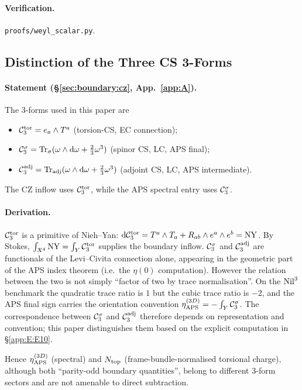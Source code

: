 \paragraph{Verification.}
\texttt{proofs/weyl\_scalar.py}.

\subsection{Distinction of the Three CS 3-Forms}
\label{app:E:E8}

\paragraph{Statement (\S\ref{sec:boundary:cz}, App.~\ref{app:A}).}
The 3-forms used in this paper are
\begin{itemize}
  \item $\mathcal{C}_3^{\mathrm{tor}} = e_a\wedge T^a$ (torsion-CS, EC connection);
  \item $\mathcal{C}_3^{\sigma} = \mathrm{Tr}_\sigma(\omega\wedge \mathrm{d}\omega + \tfrac{2}{3}\omega^3)$
        (spinor CS, LC, APS final);
  \item $\mathcal{C}_3^{\mathrm{adj}} = \mathrm{Tr}_{\mathrm{adj}}(\omega\wedge \mathrm{d}\omega + \tfrac{2}{3}\omega^3)$
        (adjoint CS, LC, APS intermediate).
\end{itemize}
The CZ inflow uses $\mathcal{C}_3^{\mathrm{tor}}$, while the APS spectral entry uses $\mathcal{C}_3^{\sigma}$.

\paragraph{Derivation.}
$\mathcal{C}_3^{\mathrm{tor}}$ is a primitive of Nieh--Yan:
$\mathrm{d}\mathcal{C}_3^{\mathrm{tor}} = T^a\wedge T_a + R_{ab}\wedge e^a\wedge e^b = \mathrm{NY}$.  By
Stokes, $\int_{X^4}\mathrm{NY} = \int_Y\mathcal{C}_3^{\mathrm{tor}}$ supplies the boundary inflow.
$\mathcal{C}_3^{\sigma}$ and $\mathcal{C}_3^{\mathrm{adj}}$ are functionals of the Levi--Civita connection alone,
appearing in the geometric part of the APS index theorem (i.e.\ the
$\eta(0)$ computation).  However the relation between the two is not
simply ``factor of two by trace normalisation''.  On the $\mathrm{Nil}^3$
benchmark the quadratic trace ratio is $1$ but the cubic trace ratio is
$-2$, and the APS final sign carries the orientation convention
$\eta_{\mathrm{APS}}^{(3D)} = -\int_Y \mathcal{C}_3^{\sigma}$.  The correspondence between $\mathcal{C}_3^{\sigma}$ and $\mathcal{C}_3^{\mathrm{adj}}$
therefore depends on representation and convention; this paper distinguishes
them based on the explicit computation in \S\ref{app:E:E10}.

Hence $\eta_{\mathrm{APS}}^{(3D)}$ (spectral) and $N_{\mathrm{top}}$ (frame-bundle-normalised torsional
charge), although both ``parity-odd boundary quantities'', belong to
different 3-form sectors and are not amenable to direct subtraction.

